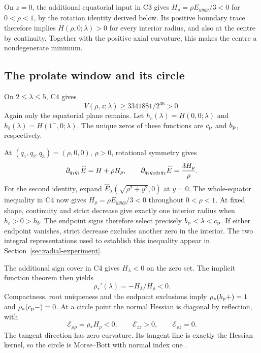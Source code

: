 On $z=0$, the additional equatorial input in C3 gives $H_\rho=\rho E_{yyyy}/3<0$ for $0<\rho<1$, by the rotation identity derived below. Its positive boundary trace therefore implies $H(\rho,0;\lambda)>0$ for every interior radius, and also at the centre by continuity. Together with the positive axial curvature, this makes the centre a nondegenerate minimum.

\subsection{The prolate window and its circle}
On $2\le\lambda\le5$, C4 gives
\begin{equation}\label{eq:window_V}
 V(\rho,z;\lambda)\ge3341881/2^{36}>0.
\end{equation}
Again only the equatorial plane remains. Let $h_c(\lambda)=H(0,0;\lambda)$ and $h_b(\lambda)=H(1^-,0;\lambda)$. The unique zeros of these functions are $c_{\mathrm p}$ and $b_{\mathrm p}$, respectively.

At $(q_1,q_2,q_3)=(\rho,0,0)$, $\rho>0$, rotational symmetry gives
\begin{equation}\label{eq:fourth_derivative}
 \partial_{q_1q_1}\widehat E=H+\rho H_\rho,\qquad
 \partial_{q_2q_2q_2q_2}\widehat E=\frac{3H_\rho}{\rho}.
\end{equation}
For the second identity, expand $\widehat E_\lambda(\sqrt{\rho^2+y^2},0)$ at $y=0$. The whole-equator inequality in C4 now gives $H_\rho=\rho E_{yyyy}/3<0$ throughout $0<\rho<1$. At fixed shape, continuity and strict decrease give exactly one interior radius when $h_c>0>h_b$. The endpoint signs therefore select precisely $b_{\mathrm p}<\lambda<c_{\mathrm p}$. If either endpoint vanishes, strict decrease excludes another zero in the interior. The two integral representations used to establish this inequality appear in Section~\ref{sec:radial-experiment}.

The additional sign cover in C4 gives $H_\lambda<0$ on the zero set. The implicit function theorem then yields
\begin{equation}\label{eq:branch_slope}
 \rho_*'(\lambda)=-H_\lambda/H_\rho<0.
\end{equation}
Compactness, root uniqueness and the endpoint exclusions imply $\rho_*(b_{\mathrm p}+)=1$ and $\rho_*(c_{\mathrm p}-)=0$. At a circle point the normal Hessian is diagonal by reflection, with
\[
 \mathcal E_{\rho\rho}=\rho_*H_\rho<0,\qquad \mathcal E_{zz}>0,
 \qquad \mathcal E_{\rho z}=0.
\]
The tangent direction has zero curvature. Its tangent line is exactly the Hessian kernel, so the circle is Morse--Bott with normal index one \citep{Bott1954}.

